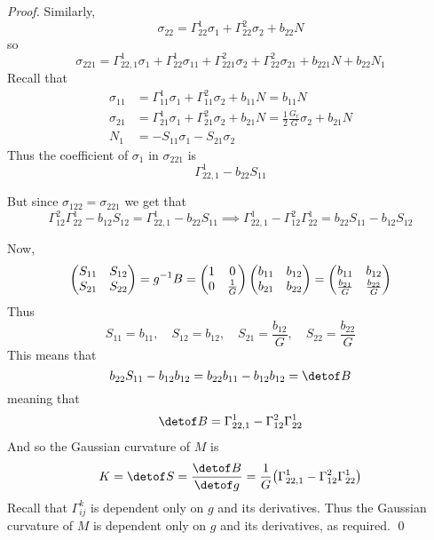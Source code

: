 \begin{proof}
    Similarly,
    \[ \sigma_{22} = \Gamma_{22}^1\sigma_1 + \Gamma_{22}^2\sigma_2 + b_{22}N  \]
    so
    \[ \sigma_{221} = \Gamma_{22,1}^1\sigma_1 + \Gamma_{22}^1\sigma_{11} + \Gamma_{221}^2\sigma_2 + \Gamma_{22}^2\sigma_{21} + b_{221}N + b_{22}N_1 \]
    Recall that
    \begin{align*}
        \sigma_{11} &= \Gamma_{11}^1\sigma_1 + \Gamma_{11}^2\sigma_2 + b_{11}N = b_{11}N \\
        \sigma_{21} &= \Gamma_{21}^1\sigma_1 + \Gamma_{21}^2\sigma_2 + b_{21}N = \frac12\frac{G_r}G\sigma_2 + b_{21}N \\
        N_1 &= -S_{11}\sigma_1 - S_{21}\sigma_2
    \end{align*}
    Thus the coefficient of $\sigma_1$ in $\sigma_{221}$ is
    \[ \Gamma_{22,1}^1 - b_{22}S_{11} \]
    
    But since $\sigma_{122}=\sigma_{221}$ we get that
    \[ \Gamma_{12}^2\Gamma_{22}^1 - b_{12}S_{12} = \Gamma_{22,1}^1 - b_{22}S_{11} \implies \Gamma_{22,1}^1 - \Gamma_{12}^2\Gamma_{22}^1 = b_{22}S_{11} - b_{12}S_{12} \]
    
    Now,
    \[ \begin{pmatrix}S_{11} & S_{12} \\ S_{21} & S_{22}\end{pmatrix} = g^{-1}B = \begin{pmatrix}1 & 0 \\ 0 & \frac1G\end{pmatrix}\begin{pmatrix}b_{11} & b_{12} \\ b_{21} & b_{22}\end{pmatrix} = \begin{pmatrix}b_{11} & b_{12} \\ \frac{b_{21}}G & \frac{b_{22}}G\end{pmatrix} \]
    Thus
    \[ S_{11} = b_{11},\quad S_{12} = b_{12},\quad S_{21} = \frac{b_{12}}G,\quad S_{22} = \frac{b_{22}}G \]
    This means that
    \[ b_{22}S_{11} - b_{12}b_{12} = b_{22}b_{11} - b_{12}b_{12} = \detof B \]
    meaning that
    \[ \detof B = \Gamma_{22,1}^1 - \Gamma_{12}^2\Gamma_{22}^1 \]
    And so the Gaussian curvature of $M$ is
    \[ K = \detof S = \frac{\detof B}{\detof g} = \frac1G\bigl(\Gamma_{22,1}^1 - \Gamma_{12}^2\Gamma_{22}^1\bigr) \]
    Recall that $\Gamma_{ij}^k$ is dependent only on $g$ and its derivatives.
    Thus the Gaussian curvature of $M$ is dependent only on $g$ and its derivatives, as required.
    \qed

\end{proof}

